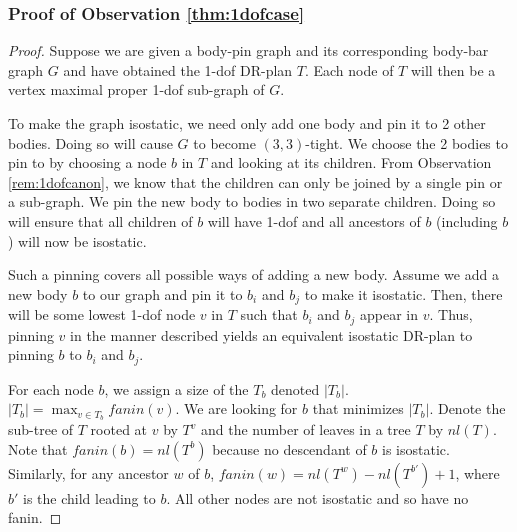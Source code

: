 \subsubsection{Proof of Observation \ref{thm:1dofcase}}
\begin{proof}
    Suppose we are given a body-pin graph and its corresponding body-bar graph $G$ and have obtained the 1-dof DR-plan $T$. Each node of $T$ will then be a vertex maximal proper 1-dof sub-graph of $G$.

    To make the graph isostatic, we need only add one body and pin it to 2 other bodies. Doing so will cause $G$ to become $(3,3)$-tight. We choose the 2 bodies to pin to by choosing a node $b$ in $T$ and looking at its children. From Observation \ref{rem:1dofcanon}, we know that the children can only be joined by a single pin or a sub-graph. We pin the new body to bodies in two separate children. Doing so will ensure that all children of $b$ will have 1-dof and all ancestors of $b$ (including $b$) will now be isostatic.


    Such a pinning covers all possible ways of adding a new body. Assume we add a new body $b$ to our graph and pin it to $b_i$ and $b_j$ to make it isostatic. Then, there will be some lowest 1-dof node $v$ in $T$ such that $b_i$ and $b_j$ appear in $v$. Thus, pinning $v$ in the manner described yields an equivalent isostatic DR-plan to pinning $b$ to $b_i$ and $b_j$.

    For each node $b$, we assign a size of the $T_b$ denoted $|T_b|$. $|T_b| = \displaystyle\max_{v \in T_b} fanin(v)$. We are looking for $b$ that minimizes $|T_b|$. Denote the sub-tree of $T$ rooted at $v$ by $T^v$ and the number of leaves in a tree $T$ by $nl(T)$. Note that $fanin(b)= nl(T^b)$ because no descendant of $b$ is isostatic. Similarly, for any ancestor $w$ of $b$, $fanin(w) = nl(T^w)-nl(T^{b'})+1$, where $b'$ is the child leading to $b$. All other nodes are not isostatic and so have no fanin.


\end{proof}
